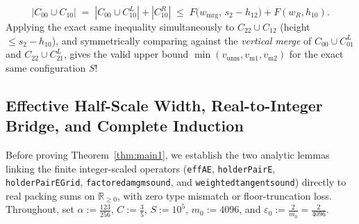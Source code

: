 \documentclass[11pt,reqno]{amsart}
\theoremstyle{plain}
\theoremstyle{definition}
\theoremstyle{remark}
\DeclareRobustCommand{\_}{\ifmmode\text{\textunderscore}\else\textunderscore\allowbreak\fi}
\begin{document}
\begin{enumerate}[label=(\arabic*),leftmargin=2em]
\begin{itemize}[leftmargin=1.4em]
    \[
      |C_{00} \cup C_{10}| \;=\; |C_{00} \cup C_{10}^L| + |C_{10}^R| \;\le\; F\bigl(w_{\mathrm{mrg}},\, s_2 - h_{12}\bigr) + F(w_R, h_{10}).
    \]
    Applying the exact same inequality simultaneously to $C_{22} \cup C_{12}$ (height $\le s_2 - h_{10}$), and symmetrically comparing against the \emph{vertical merge} of $C_{00} \cup C_{01}^L$ and $C_{22} \cup C_{21}^L$, gives the valid upper bound $\min(v_{\mathrm{unm}}, v_{\mathrm{m1}}, v_{\mathrm{m2}})$ for the exact same configuration $S$!
  \end{itemize}
\end{enumerate}

\subsection{Effective Half-Scale Width, Real-to-Integer Bridge, and Complete Induction}\label{subsec:packing-proof}

Before proving Theorem~\ref{thm:main1}, we establish the two analytic lemmas linking the finite integer-scaled operators (\texttt{effAE}, \texttt{holderPairE}, \texttt{holderPairEGrid}, \texttt{factored\_amgm\_1110\_sound}, and \texttt{weighted\_tangent\_379\_133\_sound}) directly to real packing sums on $\mathbb{R}_{\ge 0}$, with zero type mismatch or floor-truncation loss. Throughout, set $\alpha := \frac{123}{256}$, $C := \frac{3}{5}$, $S := 10^5$, $m_0 := 4096$, and $\varepsilon_0 := \frac{2}{m_0} = \frac{2}{4096}$.
\end{document}
